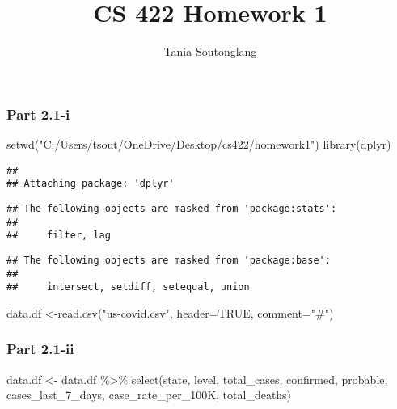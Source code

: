 \documentclass[
]{article}
\title{CS 422 Homework 1}
\author{Tania Soutonglang}
\date{}
\newenvironment{Shaded}{\begin{snugshade}}{\end{snugshade}}
\newcommand{\AttributeTok}[1]{\textcolor[rgb]{0.77,0.63,0.00}{#1}}
\newcommand{\ConstantTok}[1]{\textcolor[rgb]{0.00,0.00,0.00}{#1}}
\newcommand{\FunctionTok}[1]{\textcolor[rgb]{0.00,0.00,0.00}{#1}}
\newcommand{\NormalTok}[1]{#1}
\newcommand{\OtherTok}[1]{\textcolor[rgb]{0.56,0.35,0.01}{#1}}
\newcommand{\SpecialCharTok}[1]{\textcolor[rgb]{0.00,0.00,0.00}{#1}}
\newcommand{\StringTok}[1]{\textcolor[rgb]{0.31,0.60,0.02}{#1}}
\begin{document}
\maketitle

{
\setcounter{tocdepth}{2}
\tableofcontents
}
\hypertarget{part-2.1-i}{%
\subsubsection{Part 2.1-i}\label{part-2.1-i}}

\begin{Shaded}
\begin{Highlighting}[]
\FunctionTok{setwd}\NormalTok{(}\StringTok{"C:/Users/tsout/OneDrive/Desktop/cs422/homework1"}\NormalTok{)}
\FunctionTok{library}\NormalTok{(dplyr)}
\end{Highlighting}
\end{Shaded}

\begin{verbatim}
## 
## Attaching package: 'dplyr'
\end{verbatim}

\begin{verbatim}
## The following objects are masked from 'package:stats':
## 
##     filter, lag
\end{verbatim}

\begin{verbatim}
## The following objects are masked from 'package:base':
## 
##     intersect, setdiff, setequal, union
\end{verbatim}

\begin{Shaded}
\begin{Highlighting}[]
\NormalTok{data.df }\OtherTok{\textless{}{-}}\FunctionTok{read.csv}\NormalTok{(}\StringTok{"us{-}covid.csv"}\NormalTok{, }\AttributeTok{header=}\ConstantTok{TRUE}\NormalTok{, }\AttributeTok{comment=}\StringTok{"\#"}\NormalTok{)}
\end{Highlighting}
\end{Shaded}

\hypertarget{part-2.1-ii}{%
\subsubsection{Part 2.1-ii}\label{part-2.1-ii}}

\begin{Shaded}
\begin{Highlighting}[]
\NormalTok{data.df }\OtherTok{\textless{}{-}}\NormalTok{ data.df }\SpecialCharTok{\%\textgreater{}\%} \FunctionTok{select}\NormalTok{(state, level, total\_cases, confirmed, probable, cases\_last\_7\_days, case\_rate\_per\_100K, total\_deaths)}
\end{Highlighting}
\end{Shaded}
\end{document}
